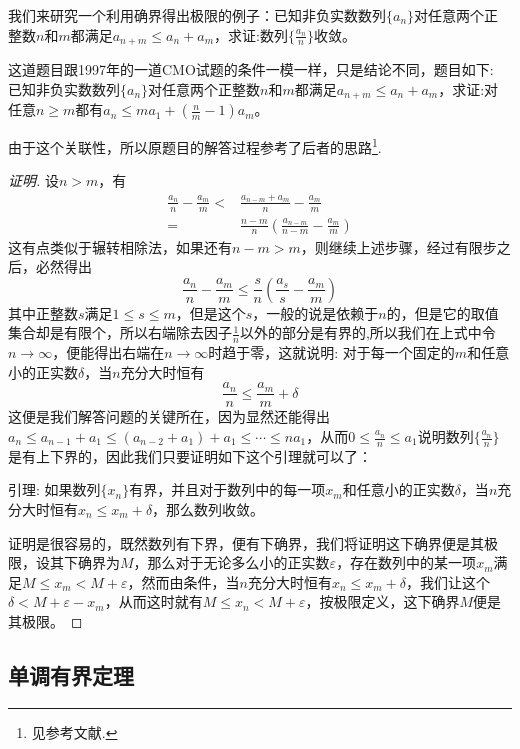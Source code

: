 \begin{example}
  我们来研究一个利用确界得出极限的例子：已知非负实数数列$\{a_n\}$对任意两个正整数$n$和$m$都满足$a_{n+m} \leqslant a_n+a_m$，求证:数列$\{\frac{a_n}{n}\}$收敛。

这道题目跟1997年的一道CMO试题的条件一模一样，只是结论不同，题目如下: 已知非负实数数列$\{a_n\}$对任意两个正整数$n$和$m$都满足$a_{n+m} \leqslant a_n+a_m$，求证:对任意$n \geqslant m$都有$a_n \leqslant ma_1+\left( \frac{n}{m}-1\right)a_m$。

由于这个关联性，所以原题目的解答过程参考了后者的思路\footnote{见参考文献\cite{olympic-math}.}.

\begin{proof}[证明]
设$n>m$，有
\begin{align*}
\frac{a_n}{n} - \frac{a_m}{m} < & \frac{a_{n-m}+a_m}{n} - \frac{a_m}{m} \\
 = & \frac{n-m}{n} \left( \frac{a_{n-m}}{n-m} - \frac{a_m}{m} \right)
\end{align*}
这有点类似于辗转相除法，如果还有$n-m>m$，则继续上述步骤，经过有限步之后，必然得出
\[ \frac{a_n}{n} - \frac{a_m}{m} \leqslant \frac{s}{n} \left( \frac{a_s}{s} - \frac{a_m}{m} \right) \]
其中正整数$s$满足$1 \leqslant s \leqslant m$，但是这个$s$，一般的说是依赖于$n$的，但是它的取值集合却是有限个，所以右端除去因子$\frac{1}{n}$以外的部分是有界的,所以我们在上式中令$n \to \infty$，便能得出右端在$n \to \infty$时趋于零，这就说明: 对于每一个固定的$m$和任意小的正实数$\delta$，当$n$充分大时恒有
\[ \frac{a_n}{n} \leqslant \frac{a_m}{m} + \delta \]
这便是我们解答问题的关键所在，因为显然还能得出$a_n \leqslant a_{n-1}+a_1 \leqslant (a_{n-2}+a_1)+a_1 \leqslant \cdots \leqslant na_1$，从而$0 \leqslant \frac{a_n}{n} \leqslant a_1$说明数列$\{\frac{a_n}{n}\}$是有上下界的，因此我们只要证明如下这个引理就可以了：

引理: 如果数列$\{ x_n \}$有界，并且对于数列中的每一项$x_m$和任意小的正实数$\delta$，当$n$充分大时恒有$x_n \leqslant x_m+\delta$，那么数列收敛。

证明是很容易的，既然数列有下界，便有下确界，我们将证明这下确界便是其极限，设其下确界为$M$，那么对于无论多么小的正实数$\varepsilon$，存在数列中的某一项$x_m$满足$M \leqslant x_m  < M+\varepsilon$，然而由条件，当$n$充分大时恒有$x_n \leqslant x_m+\delta$，我们让这个$\delta<M+\varepsilon-x_m$，从而这时就有$M \leqslant x_n  < M+\varepsilon$，按极限定义，这下确界$M$便是其极限。
\end{proof}
\end{example}

\subsection{单调有界定理}
\label{sec:monotone-bound-theorem}

